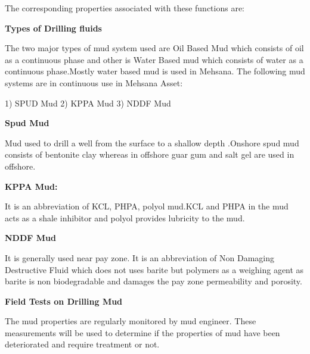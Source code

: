 \documentclass[11pt,a4paper]{article}
\begin{document}
The corresponding properties associated with these functions are:
%
%
%
%

\textbf{Types of Drilling fluids}

The two major types of mud system used are Oil Based Mud which consists of oil as a continuous phase and other is Water Based mud which consists of water as a continuous phase.Mostly water based mud is used in Mehsana. The following mud systems are in continuous use in Mehsana Asset:

1) SPUD Mud
2) KPPA Mud
3) NDDF Mud

\textbf{Spud Mud}

Mud used to drill a well from the surface to a shallow depth .Onshore spud mud consists of bentonite clay whereas in offshore guar gum and salt gel are used in offshore.

\textbf{KPPA Mud:}

It is an abbreviation of KCL, PHPA, polyol mud.KCL and PHPA in the mud acts as a shale inhibitor and polyol provides lubricity to the mud.

\textbf{NDDF Mud}

It is generally used near pay zone. It is an abbreviation of Non Damaging Destructive Fluid which does not uses barite but polymers as a weighing agent as barite is non biodegradable and damages the pay zone permeability and porosity.

\textbf{Field Tests on Drilling Mud}

The mud properties are regularly monitored by mud engineer. These measurements will be used to determine if the properties of mud have been deteriorated and require treatment or not.
\end{document}
